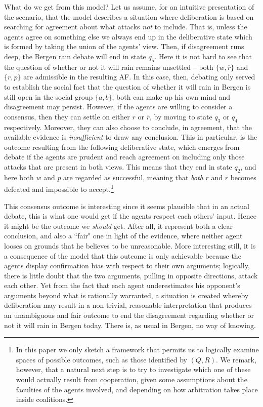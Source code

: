 \documentclass[greybox]{svmult}
\renewcommand{\bar}[1]{\overline{#1}}
\begin{document}
\begin{example}
What do we get from this model? Let us assume, for an intuitive presentation of the scenario, that the model describes a situation where deliberation is based on searching for agreement about what attacks \emph{not} to include. That is, unless the agents agree on something else we always end up in the deliberative state which is formed by taking the union of the agents' view. Then, if disagreement runs deep, the Bergen rain debate will end in state $q_5$. Here it is not hard to see that the question of whether or not it will rain remains unsettled -- both $\{w,\bar r\}$ and $\{r,p\}$ are admissible in the resulting AF. In this case, then, debating only served to establish the social fact that the question of whether it will rain in Bergen is still open in the social group $\{a, b\}$, both can make up his own mind and disagreement may persist. However, if the agents are willing to consider a consensus, then they can settle on either $r$ or $\bar r$, by moving to state $q_3$ or $q_4$ respectively. Moreover, they can also choose to conclude, in agreement, that the available evidence is \emph{insufficient} to draw any conclusion. This in particular, is the outcome resulting from the following deliberative state, which emerges from debate if the agents are prudent and reach agreement on including only those attacks that are present in both views. This means that they end in state $q_2$, and here both $w$ and $p$ are regarded as successful, meaning that \emph{both} $r$ and $\bar r$ becomes defeated and impossible to accept.\footnote{In this paper we only sketch a framework that permits us to logically examine spaces of possible outcomes, such as those identified by $(Q,R)$. We remark, however, that a natural next step is to try to investigate which one of these would actually result from cooperation, given some assumptions about the faculties of the agents involved, and depending on how arbitration takes place inside coalitions.} 

This consensus outcome is interesting since it seems plausible that in an actual debate, this is what one would get if the agents respect each others' input. Hence it might be the outcome we \emph{should} get. After all, it represent both a clear conclusion, and also a ``fair" one in light of the evidence, where neither agent looses on grounds that he believes to be unreasonable. More interesting still, it is a consequence of the model that this outcome is only achievable because the agents display confirmation bias with respect to their own arguments; logically, there is little doubt that the two arguments, pulling in opposite directions, attack each other. Yet from the fact that each agent underestimates his opponent's arguments beyond what is rationally warranted, a situation is created whereby deliberation may result in a non-trivial, reasonable interpretation that produces an unambiguous and fair outcome to end the disagreement regarding whether or not it will rain in Bergen today. There is, as usual in Bergen, no way of knowing.

\end{example}
\end{document}
